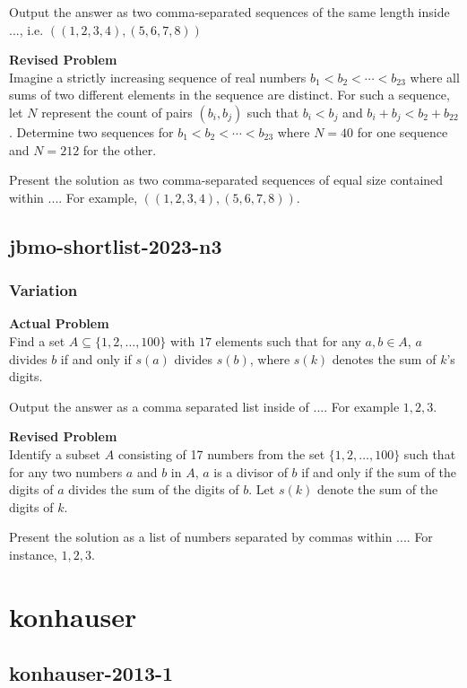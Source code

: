 Output the answer as two comma-separated sequences of the same length inside $\boxed{...}$, i.e. $\boxed{((1, 2, 3, 4), (5, 6, 7, 8))}$

\textbf{Revised Problem}\\
Imagine a strictly increasing sequence of real numbers \(b_1 < b_2 < \cdots < b_{23}\) where all sums of two different elements in the sequence are distinct. For such a sequence, let \(N\) represent the count of pairs \((b_i, b_j)\) such that \(b_i < b_j\) and \(b_i + b_j < b_2 + b_{22}\). Determine two sequences for \(b_1 < b_2 < \cdots < b_{23}\) where \(N = 40\) for one sequence and \(N = 212\) for the other.

Present the solution as two comma-separated sequences of equal size contained within \(\boxed{...}\). For example, \(\boxed{((1, 2, 3, 4), (5, 6, 7, 8))}\).

\subsection{jbmo-shortlist-2023-n3}
\subsubsection{Variation}
\textbf{Actual Problem}\\
Find a set $A\subseteq \{1, 2, \ldots, 100\}$ with $17$ elements such that for any $a, b \in A$, $a$ divides $b$ if and only if $s(a)$ divides $s(b)$, where $s(k)$ denotes the sum of $k$'s digits.

Output the answer as a comma separated list inside of $\boxed{...}$. For example $\boxed{1, 2, 3}$.

\textbf{Revised Problem}\\
Identify a subset $A$ consisting of 17 numbers from the set $\{1, 2, \ldots, 100\}$ such that for any two numbers $a$ and $b$ in $A$, $a$ is a divisor of $b$ if and only if the sum of the digits of $a$ divides the sum of the digits of $b$. Let $s(k)$ denote the sum of the digits of $k$.

Present the solution as a list of numbers separated by commas within $\boxed{...}$. For instance, $\boxed{1, 2, 3}$.

\section{konhauser}
\subsection{konhauser-2013-1}
